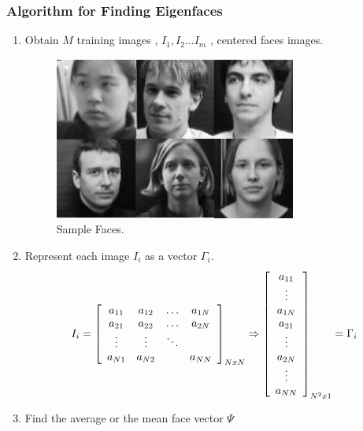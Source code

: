 \documentclass[a4paper,twoside]{article}
\begin{document}
\subsubsection{Algorithm for Finding Eigenfaces}

\begin{enumerate}
\item Obtain $M$ training images , $I_1, I_2 \dots I_m$  , centered faces images.

\begin{figure}[h]
 \begin{center}
 \centering
\includegraphics[scale=0.3]{training-images.jpg} \caption{Sample Faces. }
 \end{center}\end{figure}
\item Represent each image $I_i$ as a vector $\Gamma_i$.
\begin{equation}
\label{arrequation}
I_i  = \left[ {\begin{array}{*{20}c} {a_{11} } & {a_{12} } &\ldots& {a_{1N} }  \\
   {a_{21} } & {a_{22} } &  \ldots   & {a_{2N} }  \\
    \vdots  &  \vdots  &  \ddots   & {}  \\
   {a_{N1} } & {a_{N2} }  & {} & {a_{NN} }  \\
\end{array}} \right]_{NxN} \Rightarrow\left[
{\begin{array}{*{20}c}
   {a_{11} }  \\
   {\vdots}  \\
    {a_{1N} }  \\
     {a_{21}}  \\
        {\vdots}  \\
   {a_{2N} }  \\
   {\vdots}  \\
   {a_{NN} }  \\
\end{array}} \right]_{N^2 x1} = \Gamma _i
\end{equation}
\item Find the average or the mean face vector  $\Psi$


\end{enumerate}
\end{document}
